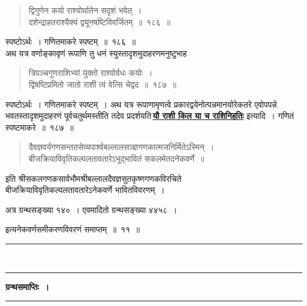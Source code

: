 \documentclass[11pt, openany]{book}
\begin{document}
 \label{186}
\begin{quote}
    \eg 
     द्विगुणेन कयो राश्योर्घातेन सदृशं भवेत्~।\\
 दशेन्द्राहतराश्यैक्यं द्व्यूनषष्टिविवर्जितम्~॥~१८६~॥

\end{quote}

 स्पष्टोऽर्थः~। गणितमाकरे स्पष्टम्~॥~१८६~॥\\

\vspace{-2mm}
 अथ यत्र वर्णाङ्कावृणं रूपाणि तु धनं स्युस्तादृशमुदाहरणमनुष्टुभाह\textendash

 \label{187}
\begin{quote}
    \eg 
     त्रिपञ्चगुणराशिभ्यां युक्तो राश्योर्वधः कयोः~।\\
 द्विषष्टिप्रमितो जातो राशी त्वं वेत्सि चेद्वद~॥~१८७~॥

\end{quote}

 स्पष्टोऽर्थः~। गणितमाकरे स्पष्टम्~।
\newpage
अथ यत्र रूपाणामृणत्वे प्रकारद्वयेनोत्पन्नमानयोरेकतरे एवोपपन्ने
भवतस्तादृशमुदाहरणं पूर्वचतुर्थमस्तीति तदेव प्रदर्शयति\textendash \,\hyperref[184]{\textbf{यौ राशी किल या च राशिनिहतिः}} इत्यादि~। गणितं स्पष्टमाकरे~॥~१८७~॥

\begin{quote}
{\qt दैवज्ञवर्यगणसन्ततसेव्यपार्श्वबल्लालसञ्ज्ञगणकात्मजनिर्मितेऽस्मिन्~।\\
 बीजक्रियाविवृतिकल्पलतावतारेऽभूद्भावितं सकलमेतदनेकवर्णे~॥~}
\end{quote} 

\begin{center}
 इति श्रीसकलगणकसार्वभौमश्रीबल्लालदैवज्ञसुतकृष्णगणकविरचिते \\ बीजक्रियाविवृतिकल्पलतावतारेऽनेकवर्णे भावितविवरणम्~। \\
    \vspace{4mm}
 
 अत्र ग्रन्थसङ्ख्या १४०~। एवमादितो
ग्रन्थसङ्ख्या ४४५८~।\\ 
\vspace{2mm}

इत्यनेकवर्णसमीकरणविवरणं समाप्तम्~॥~११~॥\\
    \vspace{10mm}
    \rule{0.3\linewidth}{0.5pt}\\
    \vspace{-5mm}
    \rule{0.3\linewidth}{0.5pt}
\end{center}
\newpage
 \label{ch12}
\begin{center}
{\LARGE \textbf{ग्रन्थसमाप्तिः~।}}\\
    \rule{0.2\linewidth}{0.5pt}\\
\end{center} 
\end{document}
